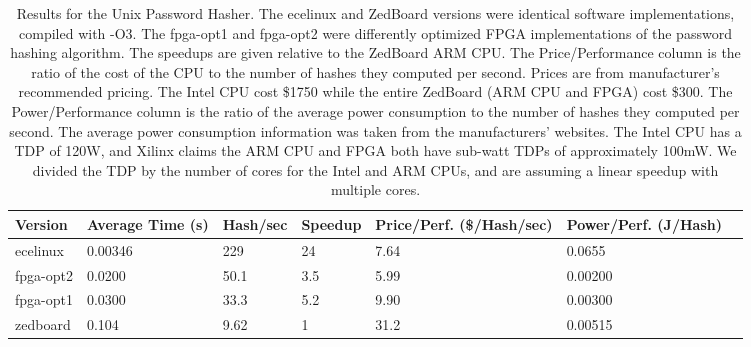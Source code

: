 \begin{table}[h]
\centering
\begin{tabular}{@{}lllllll@{}}
\toprule
  Version   & Average Time (s) & Hash/sec & Speedup & Price/Perf. (\$/Hash/sec) & Power/Perf. (J/Hash) \\ \midrule
  ecelinux  & 0.00346          & 229      & 24      & 7.64  & 0.0655                        \\
  fpga-opt2 & 0.0200           & 50.1     & 3.5     & 5.99  & 0.00200                       \\
  fpga-opt1 & 0.0300           & 33.3     & 5.2     & 9.90  & 0.00300                       \\
  zedboard  & 0.104            & 9.62     & 1       & 31.2  & 0.00515                       \\ \bottomrule
\end{tabular}
\caption {Results for the Unix Password Hasher. The ecelinux and ZedBoard versions were identical software
  implementations, compiled with -O3. The fpga-opt1 and fpga-opt2 were differently optimized FPGA
  implementations of the password hashing algorithm. The speedups are given relative to the ZedBoard ARM
  CPU. The Price/Performance column is the ratio of the cost of the CPU to the number of hashes they computed
  per second. Prices are from manufacturer's recommended pricing. The Intel CPU cost \$1750 while the
  entire ZedBoard (ARM CPU and FPGA) cost \$300. The Power/Performance column is the ratio of the average
  power consumption to the number of hashes they computed per second. The average power consumption
  information was taken from the manufacturers' websites. The Intel CPU has a TDP of 120W, and Xilinx
  claims the ARM CPU and FPGA both have sub-watt TDPs of approximately 100mW. We divided the TDP by the
  number of cores for the Intel and ARM CPUs, and are assuming a linear speedup with multiple cores.}
\label{table:hashresults}
\end{table}

